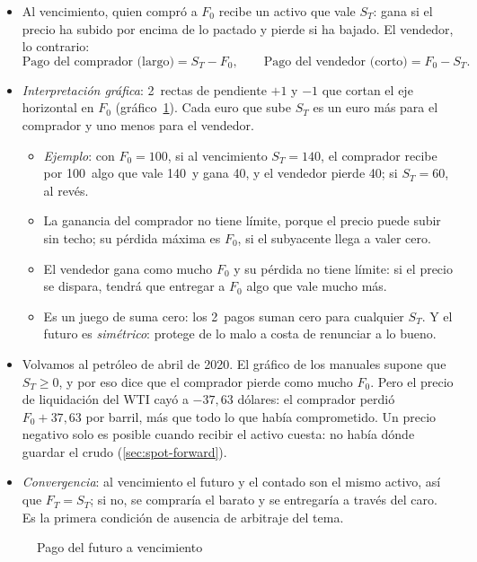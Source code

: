 \documentclass[11pt]{article}
\begin{document}
\begin{itemize}
\item Al vencimiento, quien compró a $F_0$ recibe un activo que vale $S_T$: gana si el precio ha subido por encima de lo pactado y pierde si ha bajado. El vendedor, lo contrario:
  \begin{equation}\label{eq:pago-futuro}
  \text{Pago del comprador (largo)}=S_T-F_0,\qquad \text{Pago del vendedor (corto)}=F_0-S_T.
  \end{equation}
\item \emph{Interpretación gráfica}: 2~rectas de pendiente $+1$ y $-1$ que cortan el eje horizontal en $F_0$ (gráfico~\ref{fig:pago-futuro}). Cada euro que sube $S_T$ es un euro más para el comprador y uno menos para el vendedor.
  \begin{itemize}
  \item \emph{Ejemplo}: con $F_0=100$, si al vencimiento $S_T=140$, el comprador recibe por 100~algo que vale 140~y gana 40, y el vendedor pierde 40; si $S_T=60$, al revés.
  \item La ganancia del comprador no tiene límite, porque el precio puede subir sin techo; su pérdida máxima es $F_0$, si el subyacente llega a valer cero.
  \item El vendedor gana como mucho $F_0$ y su pérdida no tiene límite: si el precio se dispara, tendrá que entregar a $F_0$ algo que vale mucho más.
  \item Es un juego de suma cero: los 2~pagos suman cero para cualquier $S_T$. Y el futuro es \emph{simétrico}: protege de lo malo a costa de renunciar a lo bueno.
  \end{itemize}
\item Volvamos al petróleo de abril de 2020. El gráfico de los manuales supone que $S_T\geq0$, y por eso dice que el comprador pierde como mucho $F_0$. Pero el precio de liquidación del WTI cayó a $-37{,}63$ dólares: el comprador perdió $F_0+37{,}63$ por barril, más que todo lo que había comprometido\nocite{CFTC2020WTI}. Un precio negativo solo es posible cuando recibir el activo cuesta: no había dónde guardar el crudo (\ref{sec:spot-forward}).
\item \emph{Convergencia}: al vencimiento el futuro y el contado son el mismo activo, así que $F_T=S_T$; si no, se compraría el barato y se entregaría a través del caro. Es la primera condición de ausencia de arbitraje del tema.
\end{itemize}

\begin{figure}[H]
\centering
\caption{Pago del futuro a vencimiento}\label{fig:pago-futuro}
\end{figure}
\end{document}
